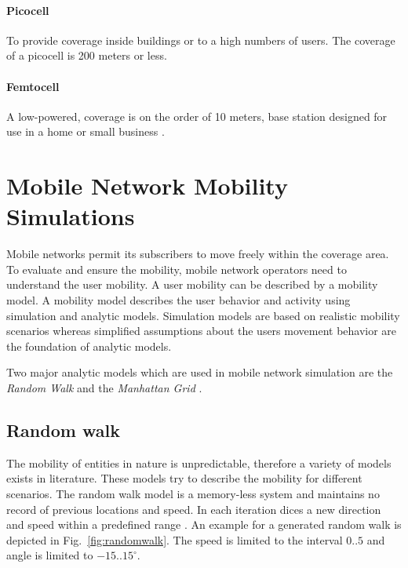 \documentclass[master,english]{hgbthesis}
\begin{document}
\paragraph{Picocell} To provide coverage inside buildings or to a high numbers of users. The coverage of a picocell is 200 meters or less.


\paragraph{Femtocell} A low-powered, coverage is on the order of 10 meters, base station designed for use in a home or small business \cite{Zhang2011}.

\section{Mobile Network Mobility Simulations}

Mobile networks permit its subscribers to move freely within the coverage area. To evaluate and ensure the mobility, mobile network operators need to understand the user mobility. A user mobility can be described by a mobility model. A mobility model describes the user behavior and activity using simulation and analytic models. Simulation models are based on realistic mobility scenarios whereas simplified assumptions about the users movement behavior are the foundation of analytic models.

Two major analytic models which are used in mobile network simulation are the \emph{Random Walk} \cite{Akyildiz2000,Bettstetter2001,Bettstetter2002} and the \emph{Manhattan Grid} \cite{Markoulidakis1997}.


\subsection{Random walk}

The mobility of entities in nature is unpredictable, therefore a variety of models exists in literature. These models try to describe the mobility for different scenarios. The random walk model is a memory-less system and maintains no record of previous locations and speed. In each iteration dices a new direction and speed within a predefined range \cite{Camp2002}. An example for a generated random walk is depicted in Fig.\ \ref{fig:randomwalk}. The speed is limited to the interval $0..5$ and angle is limited to $-15..15^\circ$.
\end{document}
